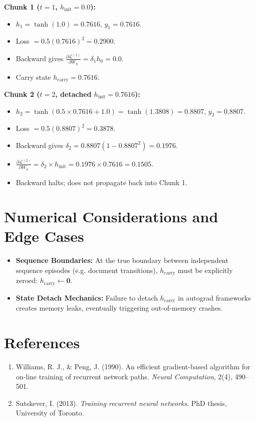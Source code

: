 \documentclass[11pt,a4paper]{article}
\theoremstyle{definition}
\begin{document}
\textbf{Chunk 1 ($t=1$, $h_{\text{init}}=0.0$):}
\begin{itemize}
    \item $h_1 = \tanh(1.0) = 0.7616$, $y_1 = 0.7616$.
    \item Loss $= 0.5(0.7616)^2 = 0.2900$.
    \item Backward gives $\frac{\partial \mathcal{L}^{(1)}}{\partial W_h} = \delta_1 h_0 = 0.0$.
    \item Carry state $h_{\text{carry}} = 0.7616$.
\end{itemize}

\textbf{Chunk 2 ($t=2$, detached $h_{\text{init}}=0.7616$):}
\begin{itemize}
    \item $h_2 = \tanh(0.5 \times 0.7616 + 1.0) = \tanh(1.3808) = 0.8807$, $y_2 = 0.8807$.
    \item Loss $= 0.5(0.8807)^2 = 0.3878$.
    \item Backward gives $\delta_2 = 0.8807(1 - 0.8807^2) = 0.1976$.
    \item $\frac{\partial \mathcal{L}^{(2)}}{\partial W_h} = \delta_2 \times h_{\text{init}} = 0.1976 \times 0.7616 = 0.1505$.
    \item Backward halts; does not propagate back into Chunk 1.
\end{itemize}

\section{Numerical Considerations and Edge Cases}

\begin{itemize}
    \item \textbf{Sequence Boundaries:} At the true boundary between independent sequence episodes (e.g. document transitions), $h_{\text{carry}}$ must be explicitly zeroed: $h_{\text{carry}} \gets \mathbf{0}$.
    \item \textbf{State Detach Mechanics:} Failure to detach $h_{\text{carry}}$ in autograd frameworks creates memory leaks, eventually triggering out-of-memory crashes.
\end{itemize}

\section{References}
\begin{enumerate}
    \item Williams, R. J., \& Peng, J. (1990). An efficient gradient-based algorithm for on-line training of recurrent network paths. \emph{Neural Computation}, 2(4), 490--501.
    \item Sutskever, I. (2013). \emph{Training recurrent neural networks}. PhD thesis, University of Toronto.
\end{enumerate}
\end{document}
